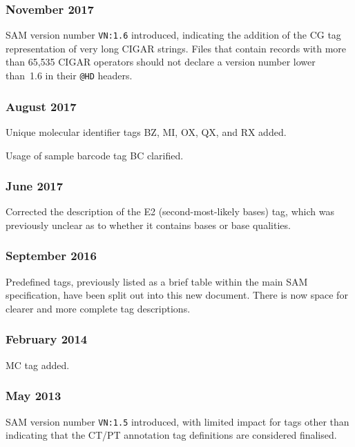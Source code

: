 \documentclass[10pt]{article}
\begin{document}
\begin{appendices}
\subsubsection*{November 2017}

SAM version number {\tt VN:1.6} introduced, indicating the addition of the CG tag representation of very long CIGAR strings.
Files that contain records with more than 65,535 CIGAR operators should not declare a version number lower than~1.6 in their {\tt @HD} headers.

\subsubsection*{August 2017}

Unique molecular identifier tags BZ, MI, OX, QX, and RX added.

Usage of sample barcode tag BC clarified.

\subsubsection*{June 2017}

Corrected the description of the E2 (second-most-likely bases) tag, which was previously unclear as to whether it contains bases or base qualities.

\subsubsection*{September 2016}

Predefined tags, previously listed as a brief table within the main SAM specification, have been split out into this new document.
There is now space for clearer and more complete tag descriptions.

\subsubsection*{February 2014}

MC tag added.

\subsubsection*{May 2013}

SAM version number {\tt VN:1.5} introduced, with limited impact for tags other than indicating that the CT/PT annotation tag definitions are considered finalised.


\end{appendices}
\end{document}
